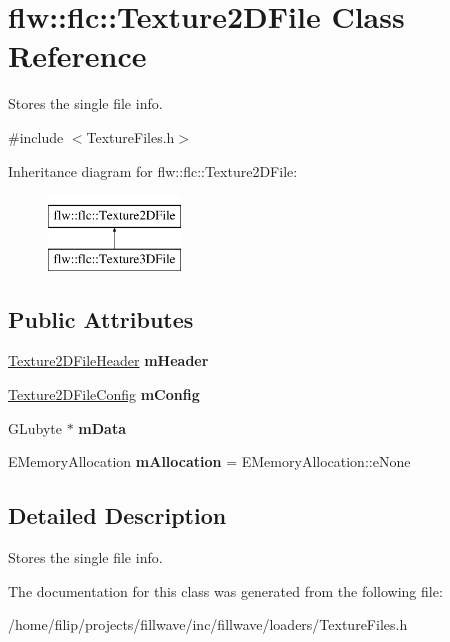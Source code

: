 \hypertarget{classflw_1_1flc_1_1Texture2DFile}{}\section{flw\+:\+:flc\+:\+:Texture2\+D\+File Class Reference}
\label{classflw_1_1flc_1_1Texture2DFile}


Stores the single file info.  




{\ttfamily \#include $<$Texture\+Files.\+h$>$}

Inheritance diagram for flw\+:\+:flc\+:\+:Texture2\+D\+File\+:\begin{figure}[H]
\begin{center}
\leavevmode
\includegraphics[height=2.000000cm]{classflw_1_1flc_1_1Texture2DFile}
\end{center}
\end{figure}
\subsection*{Public Attributes}
\begin{DoxyCompactItemize}
\item 
\mbox{\label{classflw_1_1flc_1_1Texture2DFile_aa933c4db77e23660d6e14fa362bea754}} 
\hyperlink{classflw_1_1flc_1_1Texture2DFileHeader}{Texture2\+D\+File\+Header} {\bfseries m\+Header}
\item 
\mbox{\label{classflw_1_1flc_1_1Texture2DFile_ad189b5ef185d24871c9e3ed4bcf1ee24}} 
\hyperlink{classflw_1_1flc_1_1Texture2DFileConfig}{Texture2\+D\+File\+Config} {\bfseries m\+Config}
\item 
\mbox{\label{classflw_1_1flc_1_1Texture2DFile_ae8bc963242887da04a2c3daf36def096}} 
G\+Lubyte $\ast$ {\bfseries m\+Data}
\item 
\mbox{\label{classflw_1_1flc_1_1Texture2DFile_a3ed43011eeec21a399d9e91c9c7b932e}} 
E\+Memory\+Allocation {\bfseries m\+Allocation} = E\+Memory\+Allocation\+::e\+None
\end{DoxyCompactItemize}


\subsection{Detailed Description}
Stores the single file info. 

The documentation for this class was generated from the following file\+:\begin{DoxyCompactItemize}
\item 
/home/filip/projects/fillwave/inc/fillwave/loaders/Texture\+Files.\+h\end{DoxyCompactItemize}
